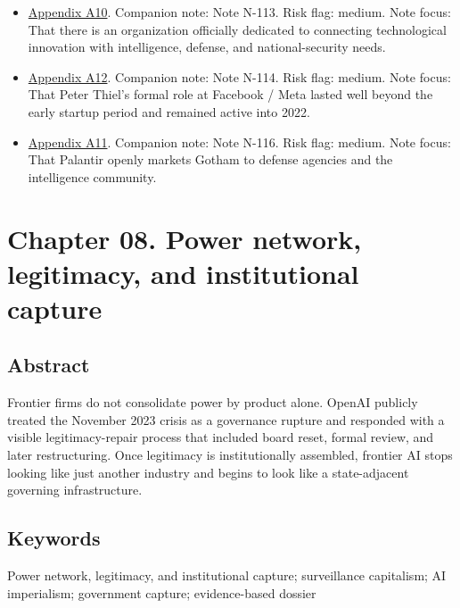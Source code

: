 \documentclass[
  american,
  11pt,
  letterpaper,
]{article}
\begin{document}
\begin{itemize}
{  A1}. Companion note: Note N-096. Risk flag: low. Note focus: That AI
  dominance was elevated to explicit state doctrine in 2025.
\item
  \hyperref[ch-07-appendix-a10-in-q-tel]{Appendix A10}. Companion note:
  Note N-113. Risk flag: medium. Note focus: That there is an
  organization officially dedicated to connecting technological
  innovation with intelligence, defense, and national-security needs.
\item
  \hyperref[ch-07-appendix-a12-meta-platforms-inc-2022-definitive-proxy-statement]{Appendix
  A12}. Companion note: Note N-114. Risk flag: medium. Note focus: That
  Peter Thiel's formal role at Facebook / Meta lasted well beyond the
  early startup period and remained active into 2022.
\item
  \hyperref[ch-07-appendix-a11-gotham]{Appendix A11}. Companion note:
  Note N-116. Risk flag: medium. Note focus: That Palantir openly
  markets Gotham to defense agencies and the intelligence community.
\end{itemize}

\newpage

\section{Chapter 08. Power network, legitimacy, and institutional
capture}\label{chapter-08.-power-network-legitimacy-and-institutional-capture}

\subsection{Abstract}\label{abstract-8}

Frontier firms do not consolidate power by product alone. OpenAI
publicly treated the November 2023 crisis as a governance rupture and
responded with a visible legitimacy-repair process that included board
reset, formal review, and later restructuring. Once legitimacy is
institutionally assembled, frontier AI stops looking like just another
industry and begins to look like a state-adjacent governing
infrastructure.

\subsection{Keywords}\label{keywords-8}

Power network, legitimacy, and institutional capture; surveillance
capitalism; AI imperialism; government capture; evidence-based dossier
\end{document}
